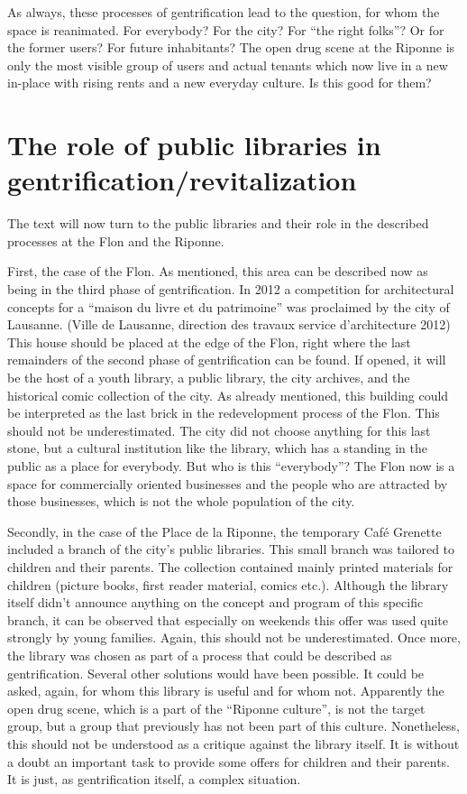 \documentclass[a4paper,
fontsize=11pt,
oneside,
numbers=noperiodatend,
parskip=half-,
bibliography=totoc,
final
]{scrartcl}
\begin{document}
As always, these processes of gentrification lead to the question, for
whom the space is reanimated. For everybody? For the city? For
\enquote{the right folks}? Or for the former users? For future
inhabitants? The open drug scene at the Riponne is only the most visible
group of users and actual tenants which now live in a new in-place with
rising rents and a new everyday culture. Is this good for them?

\section{The role of public libraries in
gentrification/revitalization}\label{the-role-of-public-libraries-in-gentrificationrevitalization}

The text will now turn to the public libraries and their role in the
described processes at the Flon and the Riponne.

First, the case of the Flon. As mentioned, this area can be described
now as being in the third phase of gentrification. In 2012 a competition
for architectural concepts for a \enquote{maison du livre et du
patrimoine} was proclaimed by the city of Lausanne. (Ville de Lausanne,
direction des travaux service d'architecture 2012) This house should be
placed at the edge of the Flon, right where the last remainders of the
second phase of gentrification can be found. If opened, it will be the
host of a youth library, a public library, the city archives, and the
historical comic collection of the city. As already mentioned, this
building could be interpreted as the last brick in the redevelopment
process of the Flon. This should not be underestimated. The city did not
choose anything for this last stone, but a cultural institution like the
library, which has a standing in the public as a place for everybody.
But who is this \enquote{everybody}? The Flon now is a space for
commercially oriented businesses and the people who are attracted by
those businesses, which is not the whole population of the city.

Secondly, in the case of the Place de la Riponne, the temporary Café
Grenette included a branch of the city's public libraries. This small
branch was tailored to children and their parents. The collection
contained mainly printed materials for children (picture books, first
reader material, comics etc.). Although the library itself didn't
announce anything on the concept and program of this specific branch, it
can be observed that especially on weekends this offer was used quite
strongly by young families. Again, this should not be underestimated.
Once more, the library was chosen as part of a process that could be
described as gentrification. Several other solutions would have been
possible. It could be asked, again, for whom this library is useful and
for whom not. Apparently the open drug scene, which is a part of the
\enquote{Riponne culture}, is not the target group, but a group that
previously has not been part of this culture. Nonetheless, this should
not be understood as a critique against the library itself. It is
without a doubt an important task to provide some offers for children
and their parents. It is just, as gentrification itself, a complex
situation.
\end{document}
